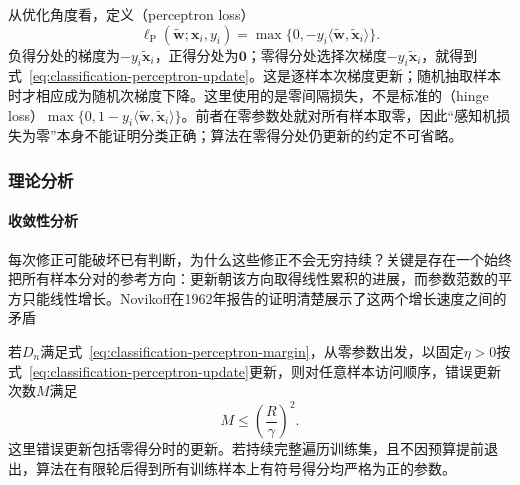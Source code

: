 从优化角度看，定义（perceptron loss）
\begin{equation}
  \label{eq:classification-perceptron-loss}
  \ell_{\mathrm{P}}(\tilde{\bm{w}};\bm{x}_i,y_i)
    =\max\{0,-y_i\langle\tilde{\bm{w}},\tilde{\bm{x}}_i\rangle\}.
\end{equation}
负得分处的梯度为$-y_i\tilde{\bm{x}}_i$，正得分处为$\bm{0}$；零得分处选择次梯度$-y_i\tilde{\bm{x}}_i$，就得到式~\eqref{eq:classification-perceptron-update}。这是逐样本次梯度更新；随机抽取样本时才相应成为随机次梯度下降。这里使用的是零间隔损失，不是标准的（hinge loss）$\max\{0,1-y_i\langle\tilde{\bm{w}},\tilde{\bm{x}}_i\rangle\}$。前者在零参数处就对所有样本取零，因此“感知机损失为零”本身不能证明分类正确；算法在零得分处仍更新的约定不可省略。

\subsubsection{理论分析}
\label{sec:classification-perceptron-analysis}

\paragraph{收敛性分析}
每次修正可能破坏已有判断，为什么这些修正不会无穷持续？关键是存在一个始终把所有样本分对的参考方向：更新朝该方向取得线性累积的进展，而参数范数的平方只能线性增长。Novikoff在1962年报告的证明清楚展示了这两个增长速度之间的矛盾

\begin{theorem}[感知机的错误更新界]
  \label{thm:classification-perceptron-mistakes}
  若$D_n$满足式~\eqref{eq:classification-perceptron-margin}，从零参数出发，以固定$\eta>0$按式~\eqref{eq:classification-perceptron-update}更新，则对任意样本访问顺序，错误更新次数$M$满足
  \[
    M\leq\left(\frac R\gamma\right)^2 .
  \]
  这里错误更新包括零得分时的更新。若持续完整遍历训练集，且不因预算提前退出，算法在有限轮后得到所有训练样本上有符号得分均严格为正的参数。
\end{theorem}

